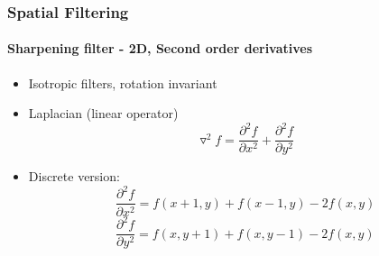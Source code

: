 \documentclass[table]{beamer}
\begin{document}
\begin{frame}
\frametitle{Spatial Filtering}
\framesubtitle{Sharpening filter - 2D, Second order derivatives}
\begin{itemize}
\item Isotropic filters, rotation invariant 
\item Laplacian (linear operator)
$$\triangledown^2 f = \frac{\partial^2 f}{\partial x^2}+ \frac{\partial^2 f}{\partial y^2}$$
\item Discrete version: 
$$\frac{\partial^2 f}{\partial x^2} = f(x+1,y) + f(x-1,y) -2f(x,y)$$
$$\frac{\partial^2 f}{\partial y^2} = f(x,y+1) + f(x,y-1) -2f(x,y)$$ 
\end{itemize}
\end{frame}
\end{document}
